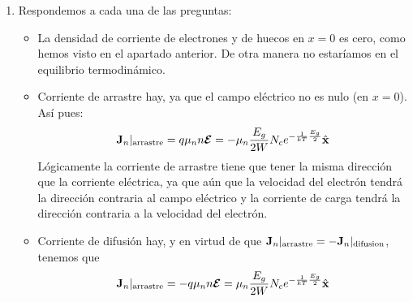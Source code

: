 \begin{texercise}
\begin{enumerate}[label=\alph*)]
		\item Respondemos a cada una de las preguntas:
		\begin{itemize}
			\item La densidad de corriente de electrones y de huecos en $x=0$ es cero, como hemos visto en el apartado anterior. De otra manera no estaríamos en el equilibrio termodinámico.
			\item Corriente de arrastre hay, ya que el campo eléctrico no es nulo (en $x=0$). Así pues: 
			\begin{equation}
				\mathbf{J}_n |_{\text{arrastre}} = q \mu_n n \boldsymbol{\mathcal{E}} =  - \mu_n \frac{E_g}{2W} N_c  e^{-\frac{1}{kT}\frac{E_g}{2}}  \hat{\mathbf{x}} 
			\end{equation}
			Lógicamente la corriente de arrastre tiene que tener la misma dirección que la corriente eléctrica, ya que aún que la velocidad del electrón tendrá la dirección contraria al campo eléctrico y la corriente de carga tendrá la dirección contraria a la velocidad del electrón. 
			\item Corriente de difusión hay, y en virtud de que $\mathbf{J}_n|_{\text{arrastre}}=- \mathbf{J}_n|_{\text{difusion}}$, tenemos que
			\begin{equation}
				\mathbf{J}_n |_{\text{arrastre}} = - q \mu_n n \boldsymbol{\mathcal{E}} =  \mu_n \frac{E_g}{2W} N_c  e^{-\frac{1}{kT}\frac{E_g}{2}}  \hat{\mathbf{x}} 
			\end{equation}
		\end{itemize}
	\end{enumerate}
\end{texercise}


